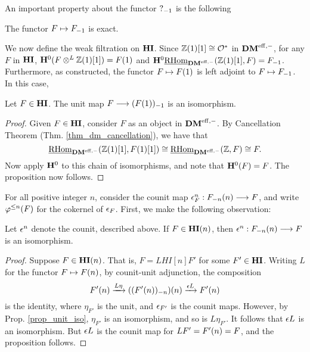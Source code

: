 An important property about the functor $\RHI{?}$ is the following

\begin{prop}
\label{prop_contract_is_exact}
The functor $F \mapsto \RHI{F}$ is exact.
\end{prop}

We now define the weak filtration on $\HI$. Since $\Z(1)[1] \cong 
\O^*$ in $\DMeff$, for any $F$ in $\HI$, $\HH^0(F \tDM \Z(1)[1]) = 
\LHI{F}$ and $\HH^0\ihomDMf(\Z(1)[1], F) = \RHI{F}$. Furthermore, 
as constructed, the functor $F \mapsto \LHI{F}$ is left adjoint to 
$F \mapsto \RHI{F}$. In this case,

\begin{prop}\label{prop_unit_iso}
Let $F \in \HI$. The unit map $F \to \RHI{(\LHI{F})}$ is an
isomorphism.
\end{prop}
\begin{proof}
Given $F \in \HI$, consider $F$ as an object in $\DMeff$. By
Cancellation Theorem (Thm. \ref{thm_dm_cancellation}), we have
that 
\[
\ihomDMf(\Z(1)[1], F(1)[1]) \cong \ihomDMf(\Z, F) 
\cong F. 
\]
Now apply $\HH^0$ to this chain of isomorphisms, and note 
that $\HH^0(F) = F$. The proposition now follows.
\end{proof}

For all positive integer $n$, consider the counit map $\cuHI_F^n: 
\LHI[n]{\RHI[n]{F}} \to F$, and write $\tlHI{n}(F)$ for the 
cokernel of $\cuHI_F$. First, we make the following observation:

\begin{prop}\label{prop_counit_iso_for_HIn}
Let $\cuHI^n$ denote the counit, described above. If $F \in 
\LHI[n]{\HI}$, then $\cuHI^n : \LHI[n]{\RHI[n]{F}} \to F$ is
an isomorphism.
\end{prop}
\begin{proof}
Suppose $F \in \LHI[n]{\HI}$. That is, $F = LHI[n]{F'}$ for some 
$F' \in \HI$. Writing $L$ for the functor $F \mapsto \LHI[n]F$, 
by counit-unit adjunction, the composition
\[
\LHI[n]{F'} \xrightarrow{L\eta} \LHI[n]{(\RHI[n]{(\LHI[n]{F'})})}
   \xrightarrow{\cuHI L} \LHI[n]{F'}
\]
is the identity, where $\eta_{F'}$ is the unit, and $\cuHI_{F'}$ 
is the counit maps. However, by Prop. \ref{prop_unit_iso}, 
$\eta_{F'}$ is an isomorphism, and so is $L\eta_{F'}$. It follows
that $\cuHI L$ is an isomorphism. But $\cuHI L$ is the counit
map for $LF' = \LHI[n]{F'} = F$, and the proposition follows.
\end{proof}

